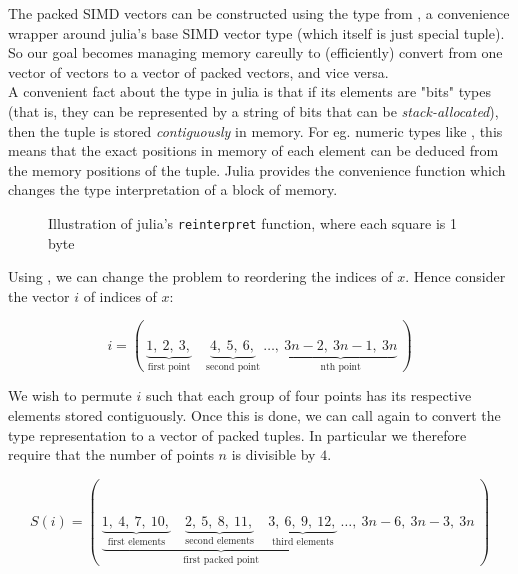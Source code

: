 The packed SIMD vectors can be constructed using the  type from  
\cite*{simd.jl}, a convenience wrapper around julia's base SIMD vector type (which itself 
is just special tuple). So our goal becomes managing memory careully to (efficiently) 
convert from one vector of vectors to a vector of packed vectors, and vice versa. \\

A convenient fact about the  type in julia is that if its elements are 
"bits" types (that is, they can be represented by a string of bits that can be \emph{stack-allocated}), 
then the tuple is stored \emph{contiguously} in memory. For eg. numeric types like 
, this means that the exact positions in memory of each element can be 
deduced from the memory positions of the tuple. Julia provides the convenience function 
 which changes the type interpretation of a block of memory. \\

\begin{figure}[ht]
    \caption{Illustration of julia's \texttt{reinterpret} function, where each square is 1 byte}
    \label{fig:reinterpret}
\end{figure}

Using , we can change the problem to reordering the indices of $x$. 
Hence consider the vector $i$ of indices of $x$: 

\begin{equation}
    i = (\ 
        \underbrace{1,\ 2,\ 3,}_{\text{first point}}\quad 
        \underbrace{4,\ 5,\ 6,}_{\text{second point}}\ 
        \ldots,\ 
        \underbrace{3n-2,\ 3n-1,\ 3n}_{\text{nth point}}
    \ )
\end{equation}

We wish to permute $i$ such that each group of four points has its respective elements 
stored contiguously. Once this is done, we can call  again to convert 
the type representation to a vector of packed tuples. In particular we therefore require 
that the number of points $n$ is divisible by $4$. 

\begin{equation}
    S(i) = (\ \underbrace{
        \underbrace{1,\ 4,\ 7,\ 10,}_{\text{first elements}}\quad 
        \underbrace{2,\ 5,\ 8,\ 11,}_{\text{second elements}}\quad
        \underbrace{3,\ 6,\ 9,\ 12,}_{\text{third elements}}\  
    }_{
        \text{first packed point}
    }
        \ldots,\ 
        3n-6,\ 3n-3,\ 3n
    \ )
\end{equation}

